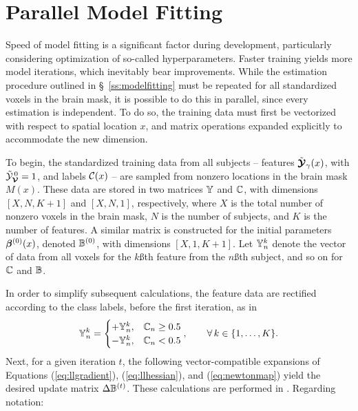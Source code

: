 \section{Parallel Model Fitting}\label{s:parallelfit}
Speed of model fitting is a significant factor during development, particularly considering optimization of so-called hyperparameters. Faster training yields more model iterations, which inevitably bear improvements. While the estimation procedure outlined in \S\ \ref{ss:modelfitting} must be repeated for all standardized voxels in the brain mask, it is possible to do this in parallel, since every estimation is independent. To do so, the training data must first be vectorized with respect to spatial location $x$, and matrix operations expanded explicitly to accommodate the new dimension.
\par
To begin, the standardized training data from all subjects -- features $\tilde{\bm{\mathcal{Y}}}_{\gamma}(x)$, with $\tilde{\mathcal{Y}}_{\bm{\mathcal{V}}}^{\thinspace0}=1$, and labels $\mathcal{C}(x)$ -- are sampled from nonzero locations in the brain mask $M(x)$. These data are stored in two matrices $\mathbb{Y}$ and $\mathbb{C}$, with dimensions $[X,N,K+1]$ and $[X,N,1]$, respectively, where $X$ is the total number of nonzero voxels in the brain mask, $N$ is the number of subjects, and $K$ is the number of features. A similar matrix is constructed for the initial parameters $\bm{\beta}^{(0)}(x)$, denoted $\mathbb{B}^{(0)}$, with dimensions $[X,1,K+1]$. Let $\mathbb{Y}_n^k$ denote the vector of data from all voxels for the $k$\ss{th} feature from the $n$\ss{th} subject, and so on for $\mathbb{C}$ and $\mathbb{B}$.
\par
In order to simplify subsequent calculations, the feature data are rectified according to the class labels, before the first iteration, as in
\begin{equation}
\mathbb{Y}_n^k =
\begin{cases}
+\mathbb{Y}_n^k, & \mathbb{C}_n \ge 0.5\\
-\mathbb{Y}_n^k, & \mathbb{C}_n <  0.5\\
\end{cases},\qquad\forall\thinspace k \in \{1,\dots,K\}.
\end{equation}
Next, for a given iteration $t$, the following vector-compatible expansions of Equations (\ref{eq:llgradient}), (\ref{eq:llhessian}), and (\ref{eq:newtonmap}) yield the desired update matrix $\Delta\mathbb{B}^{(t)}$. These calculations are performed in .
Regarding notation:
